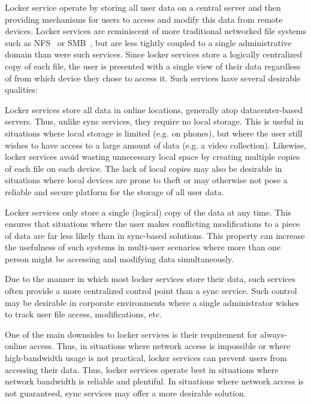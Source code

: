 Locker service operate by storing all user data on a central server
and then providing mechanisms for users to access and modify this data
from remote devices. Locker services are reminiscent of more
traditional networked file systems such as NFS~\cite{sandberg1985} or
SMB~\cite{microsoft-smb2}, but are less tightly coupled to a single
administrative domain than were such services. Since locker services
store a logically centralized copy of each file, the user is presented
with a single view of their data regardless of from which device they
chose to access it. Such services have several desirable qualities:

\begin{packed_desc}
\item[No Local Storage:] Locker services store all data in online
  locations, generally atop datacenter-based servers. Thus, unlike
  sync services, they require no local storage. This is useful in
  situations where local storage is limited (e.g. on phones), but
  where the user still wishes to have access to a large amount of data
  (e.g. a video collection). Likewise, locker services avoid wasting
  unnecessary local space by creating multiple copies of each file on
  each device. The lack of local copies may also be desirable in
  situations where local devices are prone to theft or may otherwise
  not pose a reliable and secure platform for the storage of all user
  data.
\item[Single Source of Truth:] Locker services only store a single
  (logical) copy of the data at any time. This ensures that situations
  where the user makes conflicting modifications to a piece of data
  are far less likely than in sync-based solutions. This property can
  increase the usefulness of such systems in multi-user scenarios
  where more than one person might be accessing and modifying data
  simultaneously.
\item[Centralized Control:] Due to the manner in which most locker
  services store their data, such services often provide a more
  centralized control point than a sync service. Such control may be
  desirable in corporate environments where a single administrator
  wishes to track user file access, modifications, etc.
\end{packed_desc}

One of the main downsides to locker services is their requirement for
always-online access. Thus, in situations where network access is
impossible or where high-bandwidth usage is not practical, locker
services can prevent users from accessing their data. Thus, locker
services operate best in situations where network bandwidth is
reliable and plentiful. In situations where network access is not
guaranteed, sync services may offer a more desirable solution.

